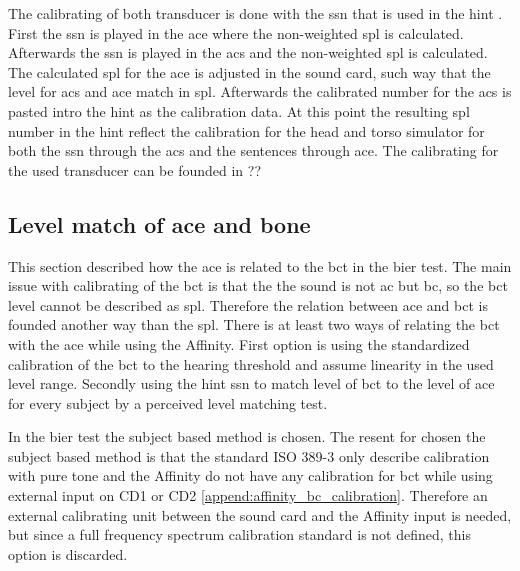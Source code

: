 The calibrating of both transducer is done with the \gls{ssn} that is used in the \gls{hint} \citep{nilsson_95}. First the \gls{ssn} is played in the \gls{ace} where the non-weighted \gls{spl} is calculated. Afterwards the \gls{ssn} is played in the \gls{acs} and the non-weighted \gls{spl} is calculated. The calculated \gls{spl} for the \gls{ace} is adjusted in the sound card, such way that the level for \gls{acs} and \gls{ace} match in \gls{spl}. Afterwards the calibrated number for the \gls{acs} is pasted intro the \gls{hint} as the calibration data. At this point the resulting \gls{spl} number in the \gls{hint} reflect the calibration for the head and torso simulator for both the \gls{ssn} through the \gls{acs} and the sentences through \gls{ace}. The calibrating for the used transducer can be founded in ??%
   
\subsection{Level match of \gls{ace} and bone}
This section described how the \gls{ace} is related to the \gls{bct} in the \gls{bier} test. The main issue with calibrating of the \gls{bct} is that the the sound is not \gls{ac} but \gls{bc}, so the \gls{bct} level cannot be described as \gls{spl}. Therefore the relation between \gls{ace} and \gls{bct} is founded another way than the \gls{spl}. There is at least two ways of relating the \gls{bct} with the \gls{ace} while using the Affinity. First option is using the standardized calibration of the \gls{bct} to the hearing threshold and assume linearity in the used level range. Secondly using the \gls{hint} \gls{ssn} \citep{nilsson_95} to match level of \gls{bct} to the level of \gls{ace} for every subject by a perceived level matching test.

In the \gls{bier} test the subject based method is chosen. The resent for chosen the subject based method is that the standard ISO 389-3 \citep{iso_389-3} only describe calibration with pure tone and the Affinity do not have any calibration for \gls{bct} while using external input on CD1 or CD2 \autoref{append:affinity_bc_calibration}. Therefore an external calibrating unit between the sound card and the Affinity input is needed, but since a full frequency spectrum calibration standard is not defined, this option is discarded.

